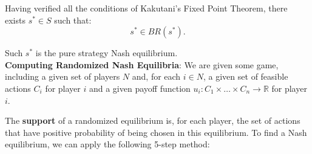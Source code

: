 \documentclass{article}
\begin{document}
Having verified all the conditions of Kakutani’s Fixed Point Theorem, there exists \(s^* \in S\) such that:
\[
    s^* \in BR(s^*).
\]

Such \(s^*\) is the pure strategy Nash equilibrium. \\ 

\noindent \textbf{Computing Randomized Nash Equilibria}: 
We are given some game, including a given set of players \( N \) and, for each \( i \in N \), a given set of feasible actions \( C_i \) for player \( i \) and a given payoff function \( u_i: C_1 \times \dots \times C_n \to \mathbb{R} \) for player \( i \).


\noindent The \textbf{support} of a randomized equilibrium is, for each player, the set of actions that have positive probability of being chosen in this equilibrium. To find a Nash equilibrium, we can apply the following 5-step method:
\end{document}
